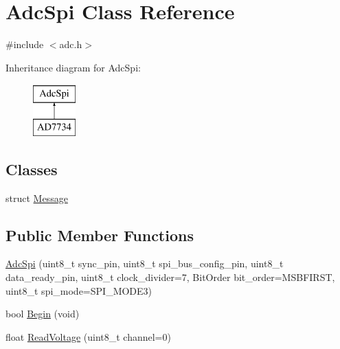\hypertarget{classAdcSpi}{}\section{Adc\+Spi Class Reference}
\label{classAdcSpi}


{\ttfamily \#include $<$adc.\+h$>$}

Inheritance diagram for Adc\+Spi\+:\begin{figure}[H]
\begin{center}
\leavevmode
\includegraphics[height=2.000000cm]{classAdcSpi}
\end{center}
\end{figure}
\subsection*{Classes}
\begin{DoxyCompactItemize}
\item 
struct \mbox{\hyperlink{structAdcSpi_1_1Message}{Message}}
\end{DoxyCompactItemize}
\subsection*{Public Member Functions}
\begin{DoxyCompactItemize}
\item 
\mbox{\hyperlink{classAdcSpi_a5b3afab7dc4a788e1caf6a1277b67df9}{Adc\+Spi}} (uint8\+\_\+t sync\+\_\+pin, uint8\+\_\+t spi\+\_\+bus\+\_\+config\+\_\+pin, uint8\+\_\+t data\+\_\+ready\+\_\+pin, uint8\+\_\+t clock\+\_\+divider=7, Bit\+Order bit\+\_\+order=M\+S\+B\+F\+I\+R\+ST, uint8\+\_\+t spi\+\_\+mode=S\+P\+I\+\_\+\+M\+O\+D\+E3)
\item 
bool \mbox{\hyperlink{classAdcSpi_aa8f8f27578dd85cfcdbc9439bbce66cb}{Begin}} (void)
\item 
float \mbox{\hyperlink{classAdcSpi_aa245df90e70654aabc64f88107ccd804}{Read\+Voltage}} (uint8\+\_\+t channel=0)
\end{DoxyCompactItemize}
